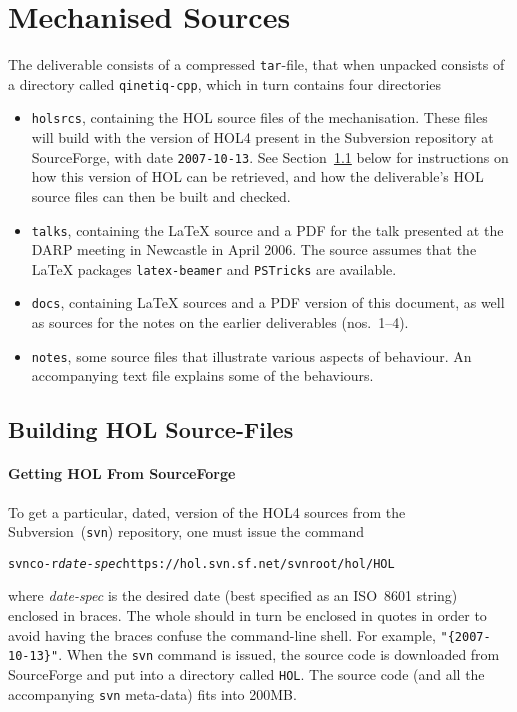 \documentclass[11pt]{article}
\begin{document}
\appendix
\section{Mechanised Sources}
\label{sec:sources}

The deliverable consists of a compressed \texttt{tar}-file, that when
unpacked consists of a directory called \texttt{qinetiq-cpp}, which in
turn contains four directories
\begin{itemize}
\item \texttt{holsrcs}, containing the HOL source files of the
  mechanisation.  These files will build with the version of HOL4
  present in the Subversion repository at SourceForge, with date
  \texttt{2007-10-13}.  See Section~\ref{sec:getting-hol} below
  for instructions on how this version of HOL can be retrieved, and
  how the deliverable's HOL source files can then be built and
  checked.
\item \texttt{talks}, containing the \LaTeX{} source and a PDF for the
  talk presented at the DARP meeting in Newcastle in April 2006.  The
  source assumes that the \LaTeX{} packages \texttt{latex-beamer} and
  \texttt{PSTricks} are available.
\item \texttt{docs}, containing \LaTeX{} sources and a PDF version of
  this document, as well as sources for the notes on the earlier
  deliverables (nos.~1--4).
\item \texttt{notes}, some \cpp{} source files that illustrate various
  aspects of \cpp{} behaviour.  An accompanying text file explains some
  of the behaviours.
\end{itemize}

\subsection{Building HOL Source-Files}
\label{sec:getting-hol}

\paragraph{Getting HOL From SourceForge}

To get a particular, dated, version of the HOL4 sources from the
Subversion~(\texttt{svn}) repository, one must issue the command
\begin{alltt}
   svn co -r \textit{date-spec} https://hol.svn.sf.net/svnroot/hol/HOL
\end{alltt}
where \textit{\ttfamily date-spec} is the desired date (best specified
as an ISO~8601 string) enclosed in braces.  The whole should in turn
be enclosed in quotes in order to avoid having the braces confuse the
command-line shell.  For example, \texttt{"\{2007-10-13\}"}.  When the
\texttt{svn} command is issued, the source code is downloaded from
SourceForge and put into a directory called \texttt{HOL}.  The source
code (and all the accompanying \texttt{svn} meta-data) fits into
200MB.
\end{document}
